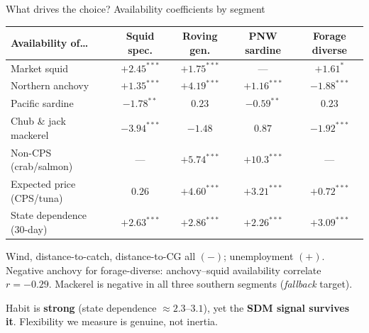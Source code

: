 \documentclass[aspectratio=169,11pt]{beamer}
\newcommand{\takeaway}[1]{\vfill\begin{takeawaybox}\small #1\end{takeawaybox}\vskip2pt}
\begin{document}
\begin{frame}{What drives the choice? Availability coefficients by segment}
\scriptsize
\begin{tabular}{@{}l c c c c@{}}
\toprule
Availability of\ldots & Squid spec. & Roving gen. & PNW sardine & Forage diverse \\
\midrule
Market squid   & $+2.45^{***}$ & $+1.75^{***}$ & --- & $+1.61^{*}$ \\
Northern anchovy & $+1.35^{***}$ & $+4.19^{***}$ & $+1.16^{***}$ & $\mathbf{-1.88^{***}}$ \\
Pacific sardine  & $-1.78^{**}$ & $0.23$ & $-0.59^{**}$ & $0.23$ \\
Chub \& jack mackerel & $-3.94^{***}$ & $-1.48$ & $0.87$ & $-1.92^{***}$ \\
Non-CPS (crab/salmon) & --- & $+5.74^{***}$ & $+10.3^{***}$ & --- \\
\midrule
Expected price (CPS/tuna) & $0.26$ & $+4.60^{***}$ & $+3.21^{***}$ & $+0.72^{***}$ \\
State dependence (30-day) & $+2.63^{***}$ & $+2.86^{***}$ & $+2.26^{***}$ & $+3.09^{***}$ \\
\bottomrule
\end{tabular}
\vskip3pt
{\scriptsize Wind, distance-to-catch, distance-to-CG all $(-)$; unemployment $(+)$. Negative anchovy for
forage-diverse: anchovy--squid availability correlate $r=-0.29$. Mackerel is negative in all three
southern segments (\emph{fallback} target).}
\takeaway{Habit is \textbf{strong} (state dependence $\approx\!2.3$--$3.1$), yet the \textbf{SDM signal
survives it}. Flexibility we measure is genuine, not inertia.}
\end{frame}
\end{document}

